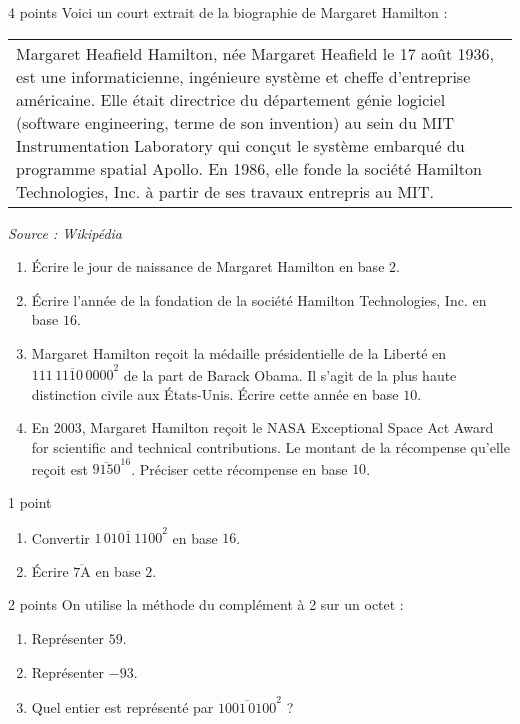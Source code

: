 \documentclass[a4paper,dvipsnames]{article}
\begin{document}
\begin{exercice}{4 points}{}
  Voici un court extrait de la biographie de Margaret Hamilton :

  \begin{center}
    \begin{tabular}{|p{12cm}}
      Margaret Heafield Hamilton, née Margaret Heafield le 17 août 1936, est une informaticienne, ingénieure système et cheffe d'entreprise américaine. Elle était directrice du département génie logiciel (\og{}software engineering\fg{}, terme de son invention) au sein du MIT Instrumentation Laboratory qui conçut le système embarqué du programme spatial Apollo. En 1986, elle fonde la société Hamilton Technologies, Inc. à partir de ses travaux entrepris au MIT.  
    \end{tabular}

    \smallskip

    \begin{minipage}{12cm}
      \flushright\textit{Source : Wikipédia}
    \end{minipage}
  \end{center}

  \begin{enumerate}
    \item Écrire le jour de naissance de Margaret Hamilton en base $2$.
    \item Écrire l'année de la fondation de la société Hamilton Technologies, Inc. en base $16$.
    \item Margaret Hamilton reçoit la médaille présidentielle de la Liberté en $\overline{111\,1110\,0000}^2$ de la part de Barack Obama. Il s'agit de la plus haute distinction civile aux États-Unis. Écrire cette année en base $10$.
    \item En 2003, Margaret Hamilton reçoit le \og{}NASA Exceptional Space Act Award for scientific and technical contributions\fg{}. Le montant de la récompense qu'elle reçoit est $\overline{9150}^{16}$. Préciser cette récompense en base $10$.
  \end{enumerate}
\end{exercice}

\medskip

\begin{exercice}{1 point}{}
 \begin{enumerate}
   \item Convertir $\overline{1\,0101\,1100}^2$ en base $16$.
   \item Écrire $\overline{7\text{A}}$ en base $2$.
 \end{enumerate} 
\end{exercice}

\medskip

\begin{exercice}{2 points}{}
 On utilise la méthode du complément à 2 sur un octet :
 \begin{enumerate}
   \item Représenter $59$.
   \item Représenter $-93$. 
   \item Quel entier est représenté par $\overline{1001\,0100}^2$ ?
 \end{enumerate}
\end{exercice}
\end{document}
